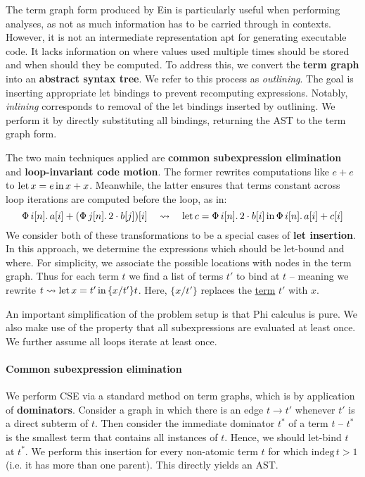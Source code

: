 The term graph form produced by Ein is particularly useful when performing analyses, as not as much information has to be carried through in contexts. However, it is not an intermediate representation apt for generating executable code. It lacks information on where values used multiple times should be stored and when should they be computed. To address this, we convert the \textbf{term graph} into an \textbf{abstract syntax tree}. We refer to this process as \textit{outlining}. The goal is inserting appropriate let bindings to prevent recomputing expressions. Notably, \textit{inlining} corresponds to removal of the let bindings inserted by outlining. We perform it by directly substituting all bindings, returning the AST to the term graph form.

The two main techniques applied are \textbf{common subexpression elimination} and \textbf{loop-invariant code motion}. The former rewrites computations like $e + e$ to  $\mathrm{let}\,{x}={e}\,\mathrm{in}\,{x + x}$. Meanwhile, the latter ensures that terms constant across loop iterations are computed before the loop, as in:
$$ 
\phivec{i}{n}{a[i] + \left( \phivec{j}{n}{2 \cdot b[j]} \right)[i]} \quad\leadsto\quad \philet{c}{\phivec{i}{n}{2 \cdot b[i]}}{\phivec{i}{n}{a[i] + c[i]}} 
$$
We consider both of these transformations to be a special cases of \textbf{let insertion}. In this approach, we determine the expressions which should be let-bound and where. For simplicity, we associate the possible locations with nodes in the term graph. Thus for each term $t$ we find a list of terms $t'$ to bind at $t$ -- meaning we rewrite $t \leadsto \mathrm{let}\,{x}={t'}\,\mathrm{in}\,{\{x/t'\}t}$. Here, $\{x/t'\}$ replaces the \underline{term} $t'$ with $x$.

An important simplification of the problem setup is that Phi calculus is pure. 
We also make use of the property that all subexpressions are evaluated at least once. We further assume all loops iterate at least once.

\paragraph{Common subexpression elimination} We perform CSE via a standard method on term graphs, which is by application of \textbf{dominators}. Consider a graph in which there is an edge $t \to t'$ whenever $t'$ is a direct subterm of $t$. Then consider the immediate dominator $t^*$ of a term $t$ -- $t^*$ is the smallest term that contains all instances of $t$. Hence, we should let-bind $t$ at $t^*$. We perform this insertion for every non-atomic term $t$ for which $\mathrm{indeg}\,t > 1$ (i.e. it has more than one parent). This directly yields an AST.

